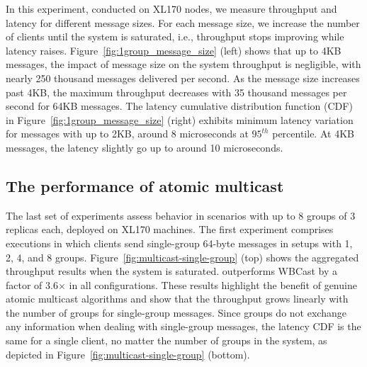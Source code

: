 In this experiment, conducted on XL170 nodes, we measure \libname throughput and latency for different message sizes.
For each message size, we increase the number of clients until the system is saturated, i.e., throughput stops improving while latency raises.
Figure~\ref{fig:1group_message_size} (left) shows that up to 4KB messages, the impact of message size on the system throughput is negligible, with nearly 250 thousand messages delivered per second. 
As the message size increases past 4KB, the maximum throughput decreases with 35 thousand messages per second for 64KB messages.
The latency cumulative distribution function (CDF) in Figure~\ref{fig:1group_message_size} (right) exhibits minimum latency variation for messages with up to 2KB, around 8 microseconds at $95^{th}$ percentile. At 4KB messages, the latency slightly go up to around 10 microseconds.


\subsection{The performance of atomic multicast}
\label{sec:evaluation:multicast}

The last set of experiments assess \libname behavior in scenarios with up to 8 groups of 3 replicas each, deployed on XL170 machines.
The first experiment comprises executions in which clients send single-group 64-byte messages in setups with 1, 2, 4, and 8 groups.
Figure~\ref{fig:multicast-single-group} (top) shows the aggregated throughput results when the system is saturated. 
\libname outperforms WBCast by a factor of 3.6$\times$ in all configurations.
These results highlight the benefit of genuine atomic multicast algorithms and show that the throughput grows linearly with the number of groups for single-group messages. 
Since groups do not exchange any information when dealing with single-group messages, the latency CDF is the same for a single client, no matter the number of groups in the system, as depicted in Figure~\ref{fig:multicast-single-group} (bottom).


